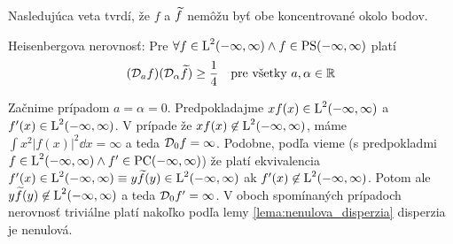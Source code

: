 Nasledujúca veta tvrdí, že $f$ a $\widetilde{f}$ nemôžu byť obe
koncentrované okolo bodov.

\begin{veta}
    Heisenbergova nerovnosť:
    Pre $\forall f\in \mbox{L}^2(-\infty,\infty) \wedge f\in \mbox{PS}(-\infty,\infty)$ platí
    \begin{equation}
        (\mathcal{D}_{a}f)(\mathcal{D}_{\alpha}\widetilde{f}) \ge \frac{1}{4}
        \quad \text{pre všetky } a,\alpha \in {\mathbb R}
        \label{eq:hei_ineq}
    \end{equation}
    \label{veta:heisenberg_ineq}
\end{veta}
\begin{dokaz}
    Začnime prípadom $a=\alpha=0$.
    Predpokladajme $x f(x) \in \mbox{L}^2(-\infty,\infty)$ a $f'(x)\in \mbox{L}^2(-\infty,\infty)$.
    V prípade že $x f(x) \not\in\mbox{L}^2(-\infty,\infty)$, máme
    $\int x^2 |f(x)|^2 \dd x = \infty$ a teda $\mathcal{D}_{0}f=\infty$.
    Podobne, podľa \todo{} vieme (s predpokladmi $f \in \mbox{L}^2(-\infty,\infty) \wedge
    f' \in \mbox{PC}(-\infty,\infty)$) že platí ekvivalencia $f'(x)\in\mbox{L}^2(-\infty,\infty) \equiv
    y\widetilde{f}(y)\in\mbox{L}^2(-\infty,\infty)$ ak $f'(x)\not\in\mbox{L}^2(-\infty,\infty)$. Potom ale 
    $y\widetilde{f}(y) \not\in\mbox{L}^2(-\infty,\infty)$ a teda $\mathcal{D}_{0}f'=\infty$.
    V oboch spomínaných prípadoch nerovnosť triviálne platí nakoľko
    podľa lemy \ref{lema:nenulova_disperzia} disperzia je nenulová.


\end{dokaz}
